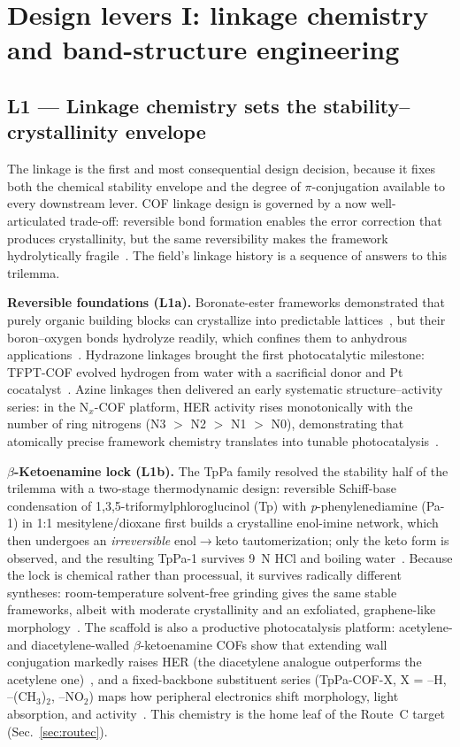 \section{Design levers I: linkage chemistry and band-structure engineering}
\label{sec:levers}

\subsection{L1 --- Linkage chemistry sets the stability--crystallinity envelope}
\label{sec:linkage}

The linkage is the first and most consequential design decision, because it fixes both the
chemical stability envelope and the degree of $\pi$-conjugation available to every downstream
lever. COF linkage design is governed by a now well-articulated trade-off: reversible bond
formation enables the error correction that produces crystallinity, but the same reversibility
makes the framework hydrolytically fragile~\cite{haase2020solving}. The field's linkage history
is a sequence of answers to this trilemma.

\textbf{Reversible foundations (L1a).} Boronate-ester frameworks demonstrated that purely
organic building blocks can crystallize into predictable lattices~\cite{cote2005porous}, but
their boron--oxygen bonds hydrolyze readily, which confines them to anhydrous
applications~\cite{cote2005porous,haase2020solving}. Hydrazone linkages brought the first
photocatalytic milestone: TFPT-COF evolved hydrogen from water with a sacrificial donor and Pt
cocatalyst~\cite{stegbauer2014a}. Azine linkages then delivered an early systematic
structure--activity series: in the N$_x$-COF platform, HER activity rises monotonically with
the number of ring nitrogens (N3 $>$ N2 $>$ N1 $>$ N0), demonstrating that atomically
precise framework chemistry translates into tunable photocatalysis~\cite{vyas2015a}.

\textbf{$\beta$-Ketoenamine lock (L1b).} The TpPa family resolved the stability half of the
trilemma with a two-stage thermodynamic design: reversible Schiff-base condensation of
1,3,5-triformylphloroglucinol (Tp) with \emph{p}-phenylenediamine (Pa-1) in 1:1
mesitylene/dioxane first builds a crystalline enol-imine network, which then undergoes an
\emph{irreversible} enol$\rightarrow$keto tautomerization; only the keto form is observed, and
the resulting TpPa-1 survives 9~N HCl and boiling water~\cite{kandambeth2012construction}.
Because the lock is chemical rather than processual, it survives radically different syntheses:
room-temperature solvent-free grinding gives the same stable frameworks, albeit with moderate
crystallinity and an exfoliated, graphene-like morphology~\cite{biswal2013mechanochemical}.
The scaffold is also a productive photocatalysis platform: acetylene- and diacetylene-walled
$\beta$-ketoenamine COFs show that extending wall conjugation markedly raises HER (the
diacetylene analogue outperforms the acetylene one)~\cite{pachfule2017diacetylene}, and a
fixed-backbone substituent series (TpPa-COF-X, X = --H, --(CH$_3$)$_2$, --NO$_2$) maps how
peripheral electronics shift morphology, light absorption, and activity~\cite{sheng2019effect}.
This chemistry is the home leaf of the Route~C target (Sec.~\ref{sec:routec}).

